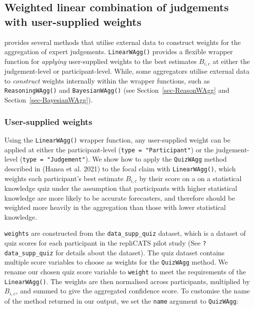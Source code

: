 \documentclass[
  11pt,
  a4paper,
]{article}
\begin{document}
\subsection{Weighted linear combination of judgements with user-supplied
weights}\label{weighted-linear-combination-of-judgements-with-user-supplied-weights}

 provides several methods that utilise external data to
construct weights for the aggregation of expert judgements.
\texttt{LinearWAgg()} provides a flexible wrapper function for
\emph{applying} user-supplied weights to the best estimates \(B_{i,c}\)
at either the judgement-level or participant-level. While, some
aggregators utilise external data to \emph{construct} weights internally
within the wrapper functions, such as \texttt{ReasoningWAgg()} and
\texttt{BayesianWAgg()} (see Section~\ref{sec-ReasonWAgg} and
Section~\ref{sec-BayesianWAgg}).

\subsubsection{User-supplied weights}\label{sec-QuizWAgg}

Using the \texttt{LinearWAgg()} wrapper function, any user-supplied
weight can be applied at either the participant-level
(\texttt{type\ =\ "Participant"}) or the judgement-level
(\texttt{type\ =\ "Judgement"}). We show how to apply the
\texttt{QuizWAgg} method described in ({Hanea et al.} 2021) to the focal
claim with \texttt{LinearWAgg()}, which weights each participant's best
estimate \(B_{i,c}\) by their score on a on a statistical knowledge quiz
under the assumption that participants with higher statistical knowledge
are more likely to be accurate forecasters, and therefore should be
weighted more heavily in the aggregation than those with lower
statistical knowledge.

\texttt{weights} are constructed from the \texttt{data\_supp\_quiz}
dataset, which is a dataset of quiz scores for each participant in the
repliCATS pilot study (See \texttt{?data\_supp\_quiz} for details about
the dataset). The quiz dataset contains multiple score variables to
choose as weights for the \texttt{QuizWAgg} method. We rename our chosen
quiz score variable to \texttt{weight} to meet the requirements of the
\texttt{LinearWAgg()}. The weights are then normalised across
participants, multiplied by \(B_{i,c}\), and summed to give the
aggregated confidence score. To customise the name of the method
returned in our output, we set the \texttt{name} argument to
\texttt{QuizWAgg}:
\end{document}

